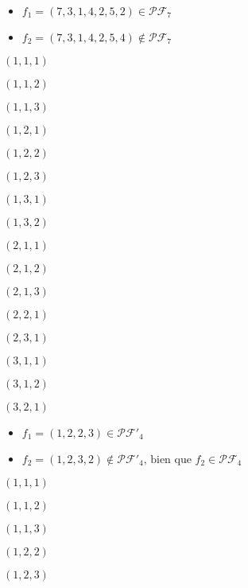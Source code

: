 \begin{example}[Définition 1 : $n = 7$]
    \begin{itemize}
        \item $f_1 = (7, 3, 1, 4, 2, 5, 2) \in \mathcal{PF}_7$
        \item $f_2 = (7, 3, 1, 4, 2, 5, 4) \notin \mathcal{PF}_7$
    \end{itemize}
\end{example}

\begin{example}[Théorème 1 : $n = 3 : pf_3 = 16$]
    \begin{itemize*}             
        \item $(1, 1, 1)$
        \item $(1, 1, 2)$
        \item $(1, 1, 3)$
        \item $(1, 2, 1)$
        \item $(1, 2, 2)$
        \item $(1, 2, 3)$
        \item $(1, 3, 1)$
        \item $(1, 3, 2)$
        \item $(2, 1, 1)$
        \item $(2, 1, 2)$
        \item $(2, 1, 3)$
        \item $(2, 2, 1)$
        \item $(2, 3, 1)$
        \item $(3, 1, 1)$
        \item $(3, 1, 2)$
        \item $(3, 2, 1)$
    \end{itemize*}
\end{example}

\begin{example}[Définition 2 : $n = 4$]
    \begin{itemize}
        \item $f_1 = (1, 2, 2, 3) \in \mathcal{PF'}_4$
        \item $f_2 = (1, 2, 3, 2) \notin \mathcal{PF'}_4
         \text{, bien que } f_2 \in \mathcal{PF}_4$
    \end{itemize}
\end{example}

\begin{example}[Théorème 2 : $n = 3 : pf'_3 = 5$]
    \begin{itemize*}
        \item $(1, 1, 1)$
        \item $(1, 1, 2)$
        \item $(1, 1, 3)$
        \item $(1, 2, 2)$
        \item $(1, 2, 3)$
    \end{itemize*}
\end{example}


